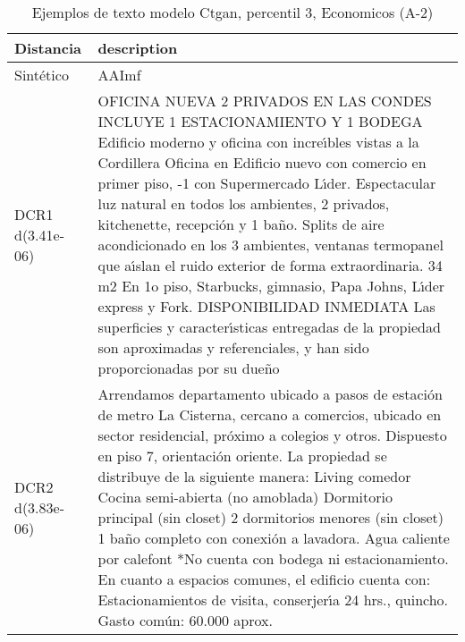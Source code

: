 \begin{table}[H]
\centering
\fontsize{10}{14}\selectfont
\caption{Ejemplos de texto modelo Ctgan, percentil 3, Economicos (A-2)}
\label{table-example-economicos-a-2-ctgan-3p-text}
\begin{tabular}{|l|m{35em}|}
\hline
\rowcolor[gray]{0.8}
Distancia & description \\
\hline Sintético & AAImf \\
\hline DCR1 d(3.41e-06) & OFICINA NUEVA 2 PRIVADOS EN LAS CONDES INCLUYE 1 ESTACIONAMIENTO Y 1 BODEGA  Edificio moderno y oficina con incre{\'\i}bles vistas a la Cordillera  Oficina en Edificio nuevo con comercio en primer piso, -1 con Supermercado L{\'\i}der. Espectacular luz natural en todos los ambientes, 2 privados, kitchenette, recepci\'on y 1 ba\~no. Splits de aire acondicionado en los 3 ambientes, ventanas termopanel que a{\'\i}slan el ruido exterior de forma extraordinaria.  34 m2  En 1o piso, Starbucks, gimnasio, Papa Johns, L{\'\i}der express y Fork.   DISPONIBILIDAD INMEDIATA   Las superficies y caracter{\'\i}sticas entregadas de la propiedad son aproximadas y referenciales, y han sido proporcionadas por su due\~no \\
\hline DCR2 d(3.83e-06) & Arrendamos departamento ubicado a pasos de estaci\'on de metro La Cisterna, cercano a comercios, ubicado en sector residencial, pr\'oximo a colegios y otros.  Dispuesto en piso 7, orientaci\'on oriente.  La propiedad se distribuye de la siguiente manera:  Living comedor Cocina semi-abierta (no amoblada) Dormitorio principal (sin closet) 2 dormitorios menores (sin closet) 1 ba\~no completo con conexi\'on a lavadora. Agua caliente por calefont  *No cuenta con bodega ni estacionamiento.  En cuanto a espacios comunes, el edificio cuenta con:  Estacionamientos de visita, conserjer{\'\i}a 24 hrs., quincho.  Gasto com\'un: 60.000 aprox. \\
\hline
\end{tabular}
\end{table}
